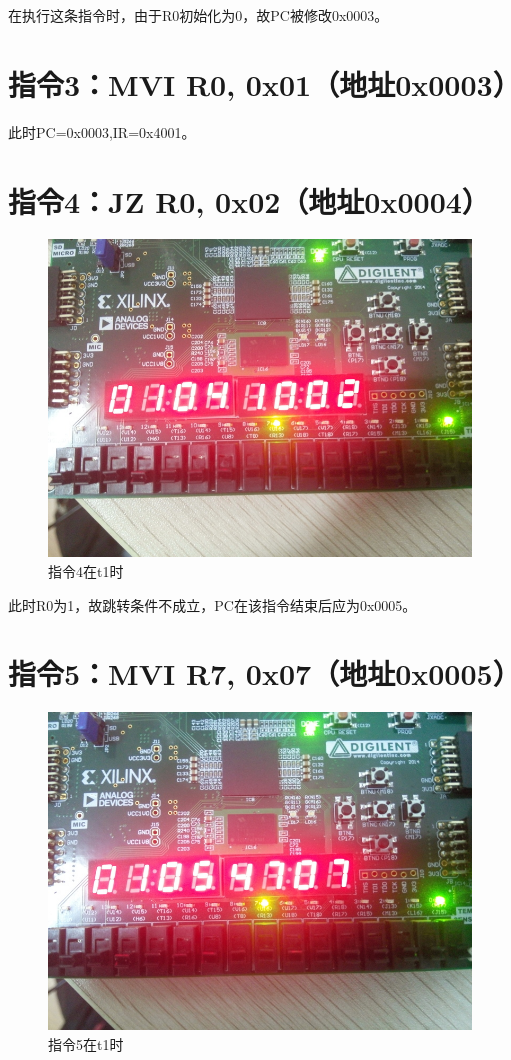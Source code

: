 \documentclass[forprint]{WHUBachelor}
\begin{document}
在执行这条指令时，由于R0初始化为0，故PC被修改0x0003。

\section{指令3：MVI R0, 0x01（地址0x0003）}

此时PC=0x0003,IR=0x4001。

\section{指令4：JZ R0, 0x02（地址0x0004）}

\begin{figure}[H]
  \centering
  \includegraphics[width=5in]{figures/download/30.jpg}
  \caption{指令4在t1时}
  \label{fig:down:30}
\end{figure}

此时R0为1，故跳转条件不成立，PC在该指令结束后应为0x0005。

\section{指令5：MVI R7, 0x07（地址0x0005）}

\begin{figure}[H]
  \centering
  \includegraphics[width=5in]{figures/download/40.jpg}
  \caption{指令5在t1时}
  \label{fig:down:40}
\end{figure}
\end{document}
